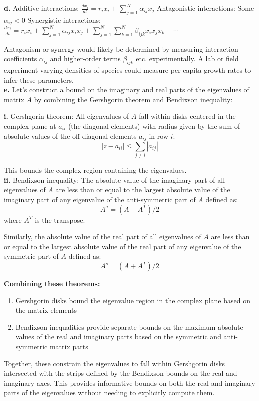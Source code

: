 \documentclass{article}
\begin{document}
\textbf{d.} Additive interactions: $\frac{dx_i}{dt} = r_i x_i + \sum_{j=1}^N \alpha_{ij} x_j$
Antagonistic interactions: Some $\alpha_{ij} < 0$ 
Synergistic interactions: $\frac{dx_i}{dt} = r_i x_i + \sum_{j=1}^N \alpha_{ij} x_i x_j + \sum_{j=1}^N \sum_{k=1}^N \beta_{ijk} x_i x_j x_k + \cdots$

Antagonism or synergy would likely be determined by measuring interaction coefficients $\alpha_{ij}$ and higher-order terms $\beta_{ijk}$ etc. experimentally. A lab or field experiment varying densities of species could measure per-capita growth rates to infer these parameters.\\


\textbf{e.} Let's construct a bound on the imaginary and real parts of the eigenvalues of matrix $A$ by combining the Gershgorin theorem and Bendixson inequality:

\textbf{i.} Gershgorin theorem:
All eigenvalues of $A$ fall within disks centered in the complex plane at $a_{ii}$ (the diagonal elements) with radius given by the sum of absolute values of the off-diagonal elements $a_{ij}$ in row $i$:
$$ |z - a_{ii}| \leq \sum_{j \neq i} |a_{ij}| $$

This bounds the complex region containing the eigenvalues.\\

\textbf{ii.} Bendixson inequality: 
The absolute value of the imaginary part of all eigenvalues of $A$ are less than or equal to the largest absolute value of the imaginary part of any eigenvalue of the anti-symmetric part of $A$ defined as:
$$ A^a = (A - A^T)/2 $$
where $A^T$ is the transpose.

Similarly, the absolute value of the real part of all eigenvalues of $A$ are less than or equal to the largest absolute value of the real part of any eigenvalue of the symmetric part of $A$ defined as: 
$$ A^s = (A + A^T)/2 $$

\textbf{Combining these theorems:}
\begin{enumerate}
    \item Gershgorin disks bound the eigenvalue region in the complex plane based on the matrix elements
    \item  Bendixson inequalities provide separate bounds on the maximum absolute values of the real and imaginary parts based on the symmetric and anti-symmetric matrix parts
\end{enumerate}

Together, these constrain the eigenvalues to fall within Gershgorin disks intersected with the strips defined by the Bendixson bounds on the real and imaginary axes. This provides informative bounds on both the real and imaginary parts of the eigenvalues without needing to explicitly compute them.
\end{document}
